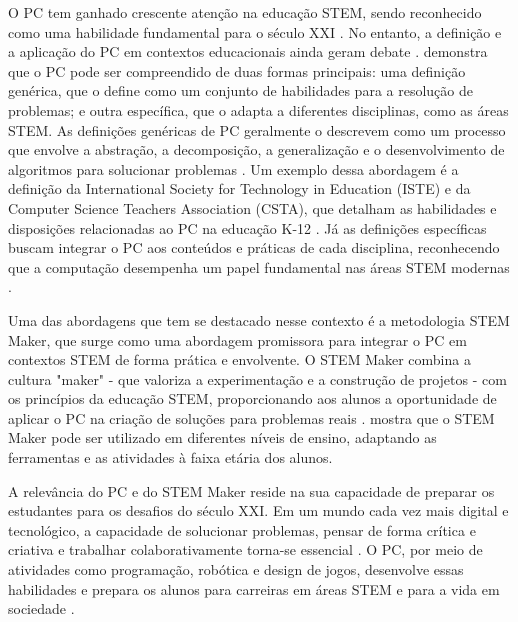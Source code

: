 \documentclass[manuscript,screen,review]{acmart}
\begin{document}
O PC tem ganhado crescente atenção na educação STEM, sendo reconhecido como uma habilidade fundamental para o século XXI \cite{Assessing,Integrating}. No entanto, a definição e a aplicação do PC em contextos educacionais ainda geram debate \cite{Assessing,Integrating}.\citet{Integrating} demonstra que o PC pode ser compreendido de duas formas principais: uma definição genérica, que o define como um conjunto de habilidades para a resolução de problemas; e outra específica, que o adapta a diferentes disciplinas, como as áreas STEM. As definições genéricas de PC geralmente o descrevem como um processo que envolve a abstração, a decomposição, a generalização e o desenvolvimento de algoritmos para solucionar problemas \cite{Assessing,Integrating}. Um exemplo dessa abordagem é a definição da International Society for Technology in Education (ISTE) e da Computer Science Teachers Association (CSTA), que detalham as habilidades e disposições relacionadas ao PC na educação K-12 \cite{Integrating}. Já as definições específicas buscam integrar o PC aos conteúdos e práticas de cada disciplina, reconhecendo que a computação desempenha um papel fundamental nas áreas STEM modernas \cite{Integrating}.

Uma das abordagens que tem se destacado nesse contexto é a metodologia STEM Maker, que surge como uma abordagem promissora para integrar o PC em contextos STEM de forma prática e envolvente. O STEM Maker combina a cultura "maker" - que valoriza a experimentação e a construção de projetos - com os princípios da educação STEM, proporcionando aos alunos a oportunidade de aplicar o PC na criação de soluções para problemas reais \cite{Measurement}. \citet{Measurement} mostra que o STEM Maker pode ser utilizado em diferentes níveis de ensino, adaptando as ferramentas e as atividades à faixa etária dos alunos.

A relevância do PC e do STEM Maker reside na sua capacidade de preparar os estudantes para os desafios do século XXI. Em um mundo cada vez mais digital e tecnológico, a capacidade de solucionar problemas, pensar de forma crítica e criativa e trabalhar colaborativamente torna-se essencial \cite{Assessing}. O PC, por meio de atividades como programação, robótica e design de jogos, desenvolve essas habilidades e prepara os alunos para carreiras em áreas STEM e para a vida em sociedade \cite{Measurement,Integrating}.
\end{document}
